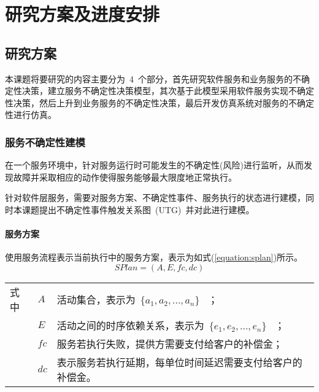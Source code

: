 

\section{研究方案及进度安排}

\subsection{研究方案}

本课题将要研究的内容主要分为~4~个部分，首先研究软件服务和业务服务的不确定性决策，建立服务不确定性决策模型，其次基于此模型采用软件服务实现不确定性决策，然后上升到业务服务的不确定性决策，最后开发仿真系统对服务的不确定性进行仿真。

\subsubsection{服务不确定性建模} \label{sec:model_section}

在一个服务环境中，针对服务运行时可能发生的不确定性(风险)进行监听，从而发现故障并采取相应的动作使得服务能够最大限度地正常执行。

针对软件层服务，需要对服务方案、不确定性事件、服务执行的状态进行建模，同时本课题提出不确定性事件触发关系图~(UTG)~并对此进行建模。

\setcounter{paragraph}{0}
\paragraph{服务方案}

使用服务流程表示当前执行中的服务方案，表示为如式(\ref{equation:splan})所示。
\begin{equation}\label{equation:splan}
SPlan = \left( {A,E,fc,dc} \right)
\end{equation}
\begin{tabularx}{\textwidth}{@{}l@{\quad}l@{\pozhehao }X@{}}
    式中
    & ${A}$ & 活动集合，表示为~$\{{a_1}, {a_2},...,{a_n}\}$ ~； \\
    & ${E}$ & 活动之间的时序依赖关系，表示为~$\{{e_1}, {e_2},...,{e_n}\}$ ~；\\
    & ${fc}$ & 服务若执行失败，提供方需要支付给客户的补偿金；\\
    & ${dc}$ & 表示服务若执行延期，每单位时间延迟需要支付给客户的补偿金。
\end{tabularx}\vspace{\wordsep}

